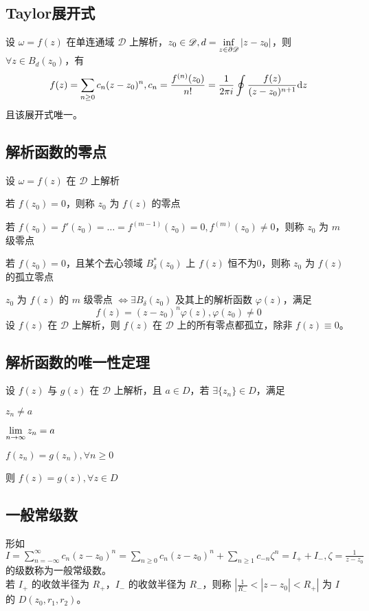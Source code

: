 \documentclass[./main.tex]{subfiles}
\begin{document}
\subsection{Taylor展开式}
设 $\omega=f(z)$ 在单连通域 $\mathscr{D}$ 上解析，$z_0\in\mathscr{D},d=\mathop{\inf}\limits_{z\in\partial\mathscr{D}}|z-z_0|$，则 $\forall z\in B_d(z_0)$，有
\begin{equation}
    f(z)=\sum_{n\ge 0}c_n(z-z_0)^n,c_n=\frac{f^{(n)}(z_0)}{n!}=\frac{1}{2\pi i}\oint\frac{f(z)}{(z-z_0)^{n+1}}\text{d}z
\end{equation}
且该展开式唯一。
\subsection{解析函数的零点}
设 $\omega=f(z)$ 在 $\mathscr{D}$ 上解析
\begin{enumerate*}
    \item 若 $f(z_0)=0$，则称 $z_0$ 为 $f(z)$ 的零点
    \item 若 $f(z_0)=f'(z_0)=\dots=f^{(m-1)}(z_0)=0,f^{(m)}(z_0)\neq 0$，则称 $z_0$ 为 $m$ 级零点
    \item 若 $f(z_0)=0$，且某个去心领域 $B^*_{\delta}(z_0)$ 上 $f(z)$ 恒不为0，则称 $z_0$ 为 $f(z)$ 的孤立零点
\end{enumerate*}
$z_0$ 为 $f(z)$ 的 $m$ 级零点 $\iff\exists B_{\delta}(z_0)$ 及其上的解析函数 $\varphi(z)$，满足 $$f(z)=(z-z_0)^n\varphi(z),\varphi(z_0)\neq 0$$
设 $f(z)$ 在 $\mathscr{D}$ 上解析，则 $f(z)$ 在 $\mathscr{D}$ 上的所有零点都孤立，除非 $f(z)\equiv 0$。
\subsection{解析函数的唯一性定理}
设 $f(z)$ 与 $g(z)$ 在 $\mathscr{D}$ 上解析，且 $a\in D$，若 $\exists\{z_n\}\in D$，满足
\begin{enumerate*}
    \item $z_n\neq a$
    \item $\lim\limits_{n\rightarrow\infty}z_n=a$
    \item $f(z_n)=g(z_n),\forall n\ge 0$
\end{enumerate*}
则 $f(z)=g(z),\forall z\in D$
\subsection{一般常级数}
形如 $I=\sum_{n=-\infty}^{\infty}c_n(z-z_0)^n=\sum_{n\ge 0}c_n(z-z_0)^n+\sum_{n\ge 1}c_{-n}\zeta^n=I_++I_-,\zeta=\frac{1}{z-z_0}$ 的级数称为一般常级数。\\
\indent 若 $I_+$ 的收敛半径为 $R_+$，$I_-$ 的收敛半径为 $R_-$，则称 $|\frac{1}{R_-}<|z-z_0|<R_+|$ 为 $I$ 的 $D(z_0,r_1,r_2)$。
\end{document}
